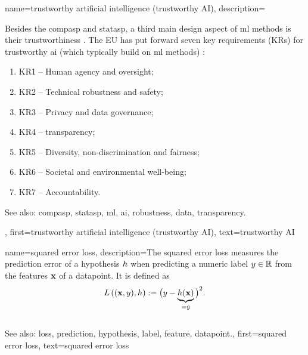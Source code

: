 {name={trustworthy artificial intelligence (trustworthy AI)},
	description={Besides the \gls{compasp} and \gls{statasp}, a third main design aspect of 
		\gls{ml} methods is their trustworthiness \cite{pfau2024engineeringtrustworthyaideveloper}. 
		The EU has put forward seven key requirements (KRs) for trustworthy 
		\gls{ai} (which typically build on \gls{ml} methods) \cite{ALTAIEU}: 
	\begin{enumerate}[label=\arabic*)]
		\item KR1 – Human agency and oversight;
		\item KR2 – Technical \gls{robustness} and safety;
		\item KR3 – Privacy and \gls{data} governance;
		\item KR4 – \Gls{transparency};
		\item KR5 – Diversity, non-discrimination and fairness; 
		\item KR6 – Societal and environmental well-being;
		\item KR7 – Accountability. 
	\end{enumerate}
		See also: \gls{compasp}, \gls{statasp}, \gls{ml}, \gls{ai}, \gls{robustness}, \gls{data}, \gls{transparency}.},
	first={trustworthy artificial intelligence (trustworthy AI)},
	text={trustworthy AI}
}

{name={squared error loss},
	description={The squared 
		error \gls{loss} measures the \gls{prediction} error of a 
		\gls{hypothesis} $h$ when predicting a numeric \gls{label} $y \in \mathbb{R}$ 
		from the \glspl{feature} ${\bf x}$ of a \gls{datapoint}. It is defined as 
		\begin{equation} 
			\nonumber
			L\left(({\bf x},y),h \right) := \big(y - \underbrace{h({\bf x})}_{=\hat{y}} \big)^{2}. 
		\end{equation} 
			\\ 
		See also: \gls{loss}, \gls{prediction}, \gls{hypothesis}, \gls{label}, \gls{feature}, \gls{datapoint}.},
	first={squared error loss},
	text={squared error loss}
}



